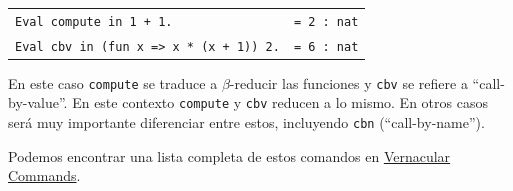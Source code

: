 \begin{description}
  \begin{center}
  \begin{tabular}{| l | l |}
  \hline
  \texttt{Eval compute in 1 + 1.} & \texttt{= 2 : nat} \\
  \texttt{Eval cbv in (fun x => x * (x + 1)) 2.} & \texttt{= 6 : nat} \\
  \hline
  \end{tabular}
  \end{center}
  En este caso \texttt{compute} se traduce a $\beta$-reducir las funciones y \texttt{cbv} se refiere a ``call-by-value''. En este contexto \texttt{compute} y \texttt{cbv} reducen a lo mismo. En otros casos será muy importante diferenciar entre estos, incluyendo \texttt{cbn} (``call-by-name'').
\end{description}

Podemos encontrar una lista completa de estos comandos en \href{https://coq.inria.fr/refman/proof-engine/vernacular-commands.html}{Vernacular Commands}.
